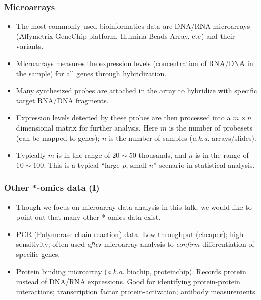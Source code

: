 \begin{frame}
  \frametitle{Microarrays}
  \begin{itemize}
  \item The most commonly used bioinformatics data are DNA/RNA
    microarrays (Affymetrix GeneChip platform, Illumina Beads Array,
    etc) and their variants.
  \item Microarrays measures the expression levels (concentration of
    RNA/DNA in the sample) for all genes through hybridization.
  \item Many synthesized \alert{probes} are attached in the array to
    hybridize with specific target RNA/DNA fragments.
  \item Expression levels detected by these probes are then processed
    into a $m\times n$ dimensional matrix for further analysis. Here
    $m$ is the number of probesets (can be mapped to genes); $n$ is
    the number of samples (\textit{a.k.a.} arrays/slides).
  \item Typically $m$ is in the range of $20\sim 50$ thousands, and
    $n$ is in the range of $10\sim 100$. This is a typical ``large
    $p$, small $n$'' scenario in statistical analysis.
  \end{itemize}
\end{frame}

\begin{frame}
  \frametitle{Other *-omics data (I)}
  \begin{itemize}
  \item Though we focus on microarray data analysis in this talk, we
    would like to point out that many other *-omics data exist.
  \item PCR (Polymerase chain reaction) data. Low throughput
    (cheaper); high sensitivity; often used \emph{after} microarray
    analysis to \emph{confirm} differentiation of specific genes.
  \item Protein binding microarray (\textit{a.k.a.} biochip,
    proteinchip).  Records protein instead of DNA/RNA
    expressions. Good for identifying protein-protein interactions;
    transcription factor protein-activation; antibody measurements.
  \end{itemize}
\end{frame}


